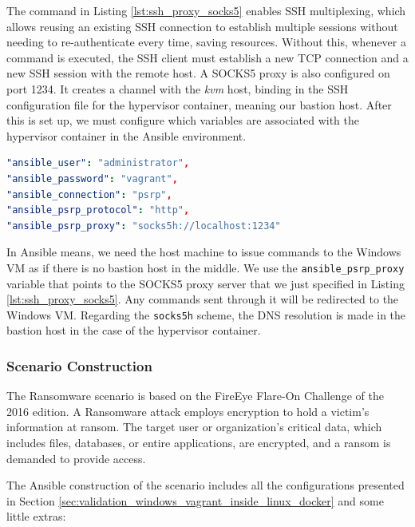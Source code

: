The command in Listing \ref{lst:ssh_proxy_socks5} enables SSH multiplexing, which allows reusing an existing SSH connection to establish multiple sessions without needing to re-authenticate every time, saving resources. Without this, whenever a command is executed, the SSH client must establish a new TCP connection and a new SSH session with the remote host. A SOCKS5 proxy is also configured on port 1234. It creates a channel with the \textit{kvm} host, binding in the SSH configuration file for the hypervisor container, meaning our bastion host. After this is set up, we must configure which variables are associated with the hypervisor container in the Ansible environment.

\begin{lstlisting}[language=yaml,caption=Ansible Variables For The Hypervisor Container.,numbers=none,label={lst:ssh_proxy_socks5}]
"ansible_user": "administrator",
"ansible_password": "vagrant",
"ansible_connection": "psrp",
"ansible_psrp_protocol": "http",
"ansible_psrp_proxy": "socks5h://localhost:1234"
\end{lstlisting}

In Ansible means, we need the host machine to issue commands to the Windows VM as if there is no bastion host in the middle. We use the \texttt{ansible\_psrp\_proxy} variable that points to the SOCKS5 proxy server that we just specified in Listing \ref{lst:ssh_proxy_socks5}. Any commands sent through it will be redirected to the Windows VM. Regarding the \texttt{socks5h} scheme, the DNS resolution is made in the bastion host in the case of the hypervisor container.

\subsubsection{Scenario Construction} \label{sec:validation_ransomware_construction}

The Ransomware scenario is based on the FireEye Flare-On Challenge of the 2016 edition. A Ransomware attack employs encryption to hold a victim's information at ransom. The target user or organization's critical data, which includes files, databases, or entire applications, are encrypted, and a ransom is demanded to provide access. 

The Ansible construction of the scenario includes all the configurations presented in Section \ref{sec:validation_windows_vagrant_inside_linux_docker} and some little extras:

